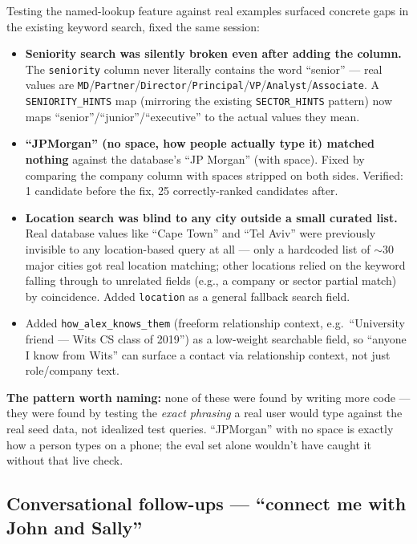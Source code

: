 \documentclass[11pt, a4paper]{article}
\begin{document}
Testing the named-lookup feature against real examples surfaced concrete gaps in the existing keyword search, fixed the same session:
\begin{itemize}
    \item \textbf{Seniority search was silently broken even after adding the column.} The \texttt{seniority} column never literally contains the word ``senior'' --- real values are \texttt{MD}/\texttt{Partner}/\texttt{Director}/\texttt{Principal}/\texttt{VP}/\texttt{Analyst}/\texttt{Associate}. A \texttt{SENIORITY\_HINTS} map (mirroring the existing \texttt{SECTOR\_HINTS} pattern) now maps ``senior''/``junior''/``executive'' to the actual values they mean.
    \item \textbf{``JPMorgan'' (no space, how people actually type it) matched nothing} against the database's ``JP Morgan'' (with space). Fixed by comparing the company column with spaces stripped on both sides. Verified: 1 candidate before the fix, 25 correctly-ranked candidates after.
    \item \textbf{Location search was blind to any city outside a small curated list.} Real database values like ``Cape Town'' and ``Tel Aviv'' were previously invisible to any location-based query at all --- only a hardcoded list of $\sim$30 major cities got real location matching; other locations relied on the keyword falling through to unrelated fields (e.g., a company or sector partial match) by coincidence. Added \texttt{location} as a general fallback search field.
    \item Added \texttt{how\_alex\_knows\_them} (freeform relationship context, e.g.\ ``University friend --- Wits CS class of 2019'') as a low-weight searchable field, so ``anyone I know from Wits'' can surface a contact via relationship context, not just role/company text.
\end{itemize}
\textbf{The pattern worth naming:} none of these were found by writing more code --- they were found by testing the \emph{exact phrasing} a real user would type against the real seed data, not idealized test queries. ``JPMorgan'' with no space is exactly how a person types on a phone; the eval set alone wouldn't have caught it without that live check.

\subsection{Conversational follow-ups --- ``connect me with John and Sally''}
\label{sec:followup}
\end{document}

